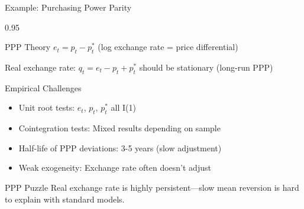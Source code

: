 \documentclass[9pt, aspectratio=169, t]{beamer}
\begin{document}
\begin{frame}{Example: Purchasing Power Parity}
    \begin{cminipage}{0.95\textwidth}
    {\small
    \begin{block}{PPP Theory}
        $e_t = p_t - p_t^*$ (log exchange rate = price differential)

        Real exchange rate: $q_t = e_t - p_t + p_t^*$ should be stationary (long-run PPP)
    \end{block}
    \begin{exampleblock}{Empirical Challenges}
        \begin{itemize}\setlength{\itemsep}{0pt}
            \item Unit root tests: $e_t$, $p_t$, $p_t^*$ all I(1)
            \item Cointegration tests: Mixed results depending on sample
            \item Half-life of PPP deviations: 3-5 years (slow adjustment)
            \item Weak exogeneity: Exchange rate often doesn't adjust
        \end{itemize}
    \end{exampleblock}
    \begin{alertblock}{PPP Puzzle}
        Real exchange rate is highly persistent---slow mean reversion is hard to explain with standard models.
    \end{alertblock}
    }
    \end{cminipage}
\end{frame}
\end{document}
